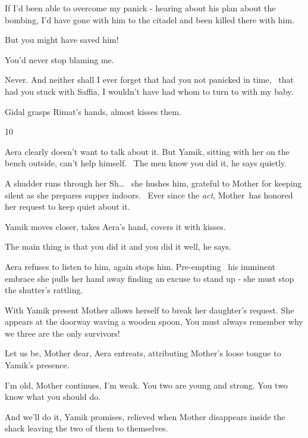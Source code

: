 \documentclass[letterpaper]{article}
\begin{document}
{\textquotedbl}If I'd been able to overcome my panick - hearing about his plan about the bombing, I'd have gone with him
to the citadel and been killed there with him.{\textquotedbl} 

{\textquotedbl}But you might have saved him!{\textquotedbl} 

{\textquotedbl}You'd never stop blaming me.{\textquotedbl} 

{\textquotedbl}Never. And neither shall I ever forget that had you not panicked in time, \textcolor{red}{\ }that had you
stuck with Saffia, I wouldn't have had whom to turn to with my baby.{\textquotedbl}

Gidal grasps Rimat's hands, almost kisses them. ~


\bigskip

10 

Aera clearly doesn't want to talk about it. But Yamik, sitting with her on the bench outside, can't help himself.
\ {\textquotedbl}The men know you did it,{\textquotedbl} he says quietly.

A shudder runs through her {\textquotedbl}Sh{\dots}{\textquotedbl} \ she hushes him, grateful to Mother for keeping
silent as she prepares supper indoors.~ Ever since the \textit{act}, Mother~has honored her request to keep quiet about
it. 

Yamik moves closer, takes Aera's hand, covers it with kisses. 

{\textquotedbl}The main thing is that you did it and you did it well,{\textquotedbl} he says.

Aera refuses to listen to him, again stops him. Pre-empting\textcolor{red}{ }\ his imminent embrace she pulls her hand
away finding an excuse to stand up - she must stop the shutter's rattling.

With Yamik present Mother allows herself to break her daughter's request. She appears at the doorway waving a wooden
spoon, {\textquotedbl}You must always remember why we three are the only survivors!{\textquotedbl} 

{\textquotedbl}Let us be, Mother dear,{\textquotedbl} Aera entreats, attributing Mother's loose tongue to Yamik's
presence.

{\textquotedbl}I'm old,{\textquotedbl} Mother continues, {\textquotedbl}I'm weak. You two are young and strong. You two
know what you should do.{\textquotedbl}

{\textquotedbl}And we'll do it,{\textquotedbl} Yamik promises, relieved when Mother disappears inside the shack leaving
the two of them to themselves. 
\end{document}
